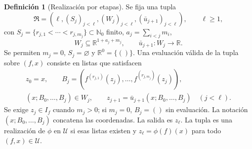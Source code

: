 \documentclass[11pt,a4paper]{article}
\numberwithin{equation}{section}
\theoremstyle{definition}
\newtheorem{definition}[theorem]{Definición}
\theoremstyle{remark}
\newcommand{\R}{\mathbb R}
\newcommand{\Nn}{\mathbb N_0}
\begin{document}
\begin{definition}[Realización por etapas]\label{def:stages}
Se fija una tupla
\[
\mathfrak R=(\ell,(S_j)_{j<\ell},(W_j)_{j<\ell},(\bar u_{j+1})_{j<\ell}),\qquad\ell\ge1,
\]
con $S_j=\{r_{j,1}<\cdots<r_{j,m_j}\}\subset\Nn$ finito, $a_j=\sum_{i<j}m_i$,
\[
W_j\subseteq\R^{1+a_j+m_j},\qquad \bar u_{j+1}:W_j\to\R.
\]
Se permiten $m_j=0$, $S_j=\varnothing$ y $\R^0=\{()\}$. Una evaluación válida de la tupla sobre $(f,x)$ consiste en listas que satisfacen
\begin{equation}\label{eq:reducedstages}
\begin{gathered}
z_0=x,\qquad B_j=(f^{(r_{j,1})}(z_j),\ldots,f^{(r_{j,m_j})}(z_j)),\\
(x;B_0,\ldots,B_j)\in W_j,\qquad
z_{j+1}=\bar u_{j+1}(x;B_0,\ldots,B_j)\quad(j<\ell).
\end{gathered}
\end{equation}
Se exige $z_j\in I_f$ cuando $m_j>0$; si $m_j=0$, $B_j=()$ sin evaluación. La notación $(x;B_0,\ldots,B_j)$ concatena las coordenadas. La salida es $z_\ell$. La tupla es una realización de $\phi$ en $\mathcal U$ si esas listas existen y $z_\ell=\phi(f)(x)$ para todo $(f,x)\in\mathcal U$.
\end{definition}
\end{document}

